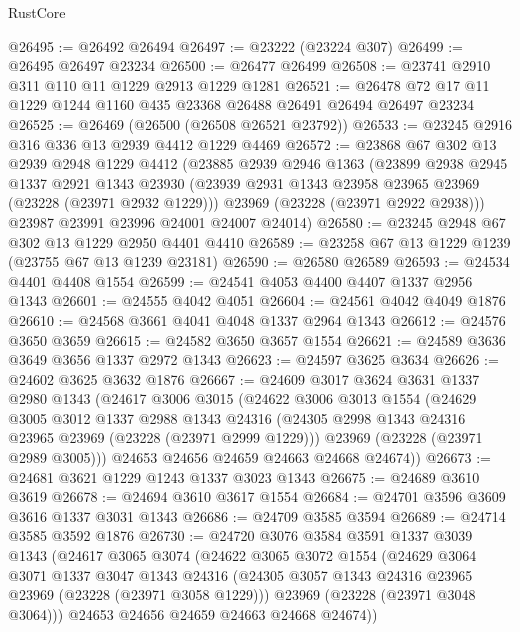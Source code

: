 \begin{lexlean}{RustCore}
\begin{coremodule}
@26495 := @26492 @26494
@26497 := @23222 (@23224 @307)
@26499 := @26495 @26497 @23234
@26500 := @26477 @26499
@26508 := @23741 @2910 @311 @110 @11 @1229 @2913 @1229 @1281
@26521 := @26478 @72 @17 @11 @1229 @1244 @1160 @435 @23368 @26488 @26491 @26494 @26497 @23234
@26525 := @26469 (@26500 (@26508 @26521 @23792))
@26533 := @23245 @2916 @316 @336 @13 @2939 @4412 @1229 @4469
@26572 := @23868
    @67
    @302
    @13
    @2939
    @2948
    @1229
    @4412
    (@23885
      @2939
      @2946
      @1363
      (@23899
        @2938
        @2945
        @1337
        @2921
        @1343
        @23930
        (@23939 @2931 @1343 @23958 @23965 @23969 (@23228 (@23971 @2932 @1229)))
        @23969
        (@23228 (@23971 @2922 @2938)))
      @23987
      @23991
      @23996
      @24001
      @24007
      @24014)
@26580 := @23245 @2948 @67 @302 @13 @1229 @2950 @4401 @4410
@26589 := @23258 @67 @13 @1229 @1239 (@23755 @67 @13 @1239 @23181)
@26590 := @26580 @26589
@26593 := @24534 @4401 @4408 @1554
@26599 := @24541 @4053 @4400 @4407 @1337 @2956 @1343
@26601 := @24555 @4042 @4051
@26604 := @24561 @4042 @4049 @1876
@26610 := @24568 @3661 @4041 @4048 @1337 @2964 @1343
@26612 := @24576 @3650 @3659
@26615 := @24582 @3650 @3657 @1554
@26621 := @24589 @3636 @3649 @3656 @1337 @2972 @1343
@26623 := @24597 @3625 @3634
@26626 := @24602 @3625 @3632 @1876
@26667 := @24609
    @3017
    @3624
    @3631
    @1337
    @2980
    @1343
    (@24617
      @3006
      @3015
      (@24622
        @3006
        @3013
        @1554
        (@24629
          @3005
          @3012
          @1337
          @2988
          @1343
          @24316
          (@24305 @2998 @1343 @24316 @23965 @23969 (@23228 (@23971 @2999 @1229)))
          @23969
          (@23228 (@23971 @2989 @3005)))
        @24653
        @24656
        @24659
        @24663
        @24668
        @24674))
@26673 := @24681 @3621 @1229 @1243 @1337 @3023 @1343
@26675 := @24689 @3610 @3619
@26678 := @24694 @3610 @3617 @1554
@26684 := @24701 @3596 @3609 @3616 @1337 @3031 @1343
@26686 := @24709 @3585 @3594
@26689 := @24714 @3585 @3592 @1876
@26730 := @24720
    @3076
    @3584
    @3591
    @1337
    @3039
    @1343
    (@24617
      @3065
      @3074
      (@24622
        @3065
        @3072
        @1554
        (@24629
          @3064
          @3071
          @1337
          @3047
          @1343
          @24316
          (@24305 @3057 @1343 @24316 @23965 @23969 (@23228 (@23971 @3058 @1229)))
          @23969
          (@23228 (@23971 @3048 @3064)))
        @24653
        @24656
        @24659
        @24663
        @24668
        @24674))

\end{coremodule}
\end{lexlean}
